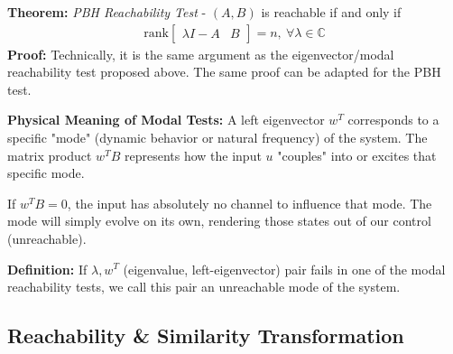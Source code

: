 \documentclass[twoside]{article}
\begin{document}
\textbf{Theorem:} \textit{PBH Reachability Test} - $(A,B)$ is reachable if and only if 
%
\begin{align*}
    \mathrm{rank} \left[ \begin{array}{c|c} \lambda I - A & B \end{array} \right] = n , \ \forall \lambda \in \mathbb{C}
\end{align*}
%
\textbf{Proof:} Technically, it is the same argument as the eigenvector/modal reachability test proposed above. The same proof can be adapted for
the PBH test.

\begin{intuition}
\textbf{Physical Meaning of Modal Tests:} 
A left eigenvector $w^T$ corresponds to a specific "mode" (dynamic behavior or natural frequency) of the system. The matrix product $w^T B$ represents how the input $u$ "couples" into or excites that specific mode. 

If $w^T B = 0$, the input has absolutely no channel to influence that mode. The mode will simply evolve on its own, rendering those states out of our control (unreachable).
\end{intuition}

\textbf{Definition:} If $\lambda, w^T$ (eigenvalue, left-eigenvector) pair fails in one of the modal reachability tests, we call this 
pair an unreachable mode of the system. 

\subsection{Reachability \& Similarity Transformation}
\end{document}
